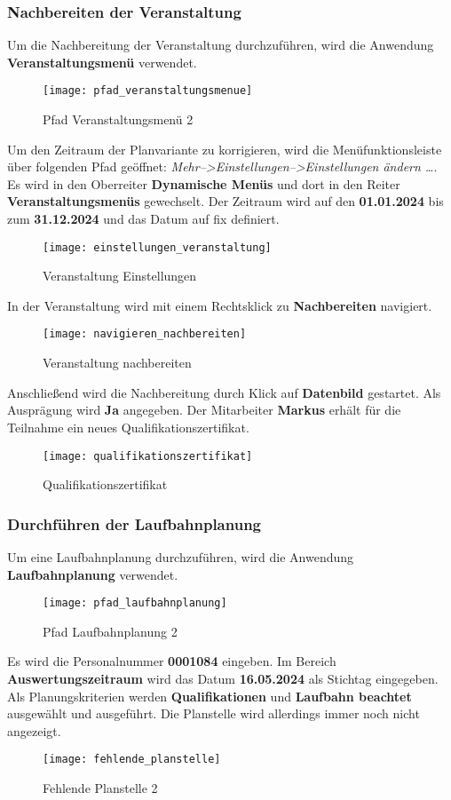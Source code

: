 \subsubsection{Nachbereiten der Veranstaltung}
Um die Nachbereitung der Veranstaltung durchzuführen, wird die Anwendung \textbf{Veranstaltungsmenü} verwendet.
\begin{figure}[H]
	\centering
	\texttt{[image: pfad\_veranstaltungsmenue]}
	\caption{Pfad Veranstaltungsmenü 2}
	\label{fig:pfad_veranstaltungsmenue2}
\end{figure}
Um den Zeitraum der Planvariante zu korrigieren, wird die Menüfunktionsleiste über folgenden Pfad geöffnet: \textit{Mehr-->Einstellungen-->Einstellungen ändern …}. Es wird in den Oberreiter \textbf{Dynamische Menüs} und dort in den Reiter \textbf{Veranstaltungsmenüs} gewechselt. Der Zeitraum wird auf den \textbf{01.01.2024} bis zum \textbf{31.12.2024} und das Datum auf fix definiert.
\begin{figure}[H]
	\centering
	\texttt{[image: einstellungen\_veranstaltung]}
	\caption{Veranstaltung Einstellungen}
	\label{fig:einstellungen_veranstaltung}
\end{figure}
In der Veranstaltung wird mit einem Rechtsklick zu \textbf{Nachbereiten} navigiert.
\begin{figure}[H]
	\centering
	\texttt{[image: navigieren\_nachbereiten]}
	\caption{Veranstaltung nachbereiten}
	\label{fig:navigieren_nachbereiten}
\end{figure}
Anschließend wird die Nachbereitung durch Klick auf \textbf{Datenbild} gestartet. Als Ausprägung wird \textbf{Ja} angegeben. Der Mitarbeiter \textbf{Markus} erhält für die Teilnahme ein neues Qualifikationszertifikat.
\begin{figure}[H]
	\centering
	\texttt{[image: qualifikationszertifikat]}
	\caption{Qualifikationszertifikat}
	\label{fig:qualifikationszertifikat}
\end{figure}

\subsubsection{Durchführen der Laufbahnplanung}
Um eine Laufbahnplanung durchzuführen, wird die Anwendung \textbf{Laufbahnplanung} verwendet.
\begin{figure}[H]
	\centering
	\texttt{[image: pfad\_laufbahnplanung]}
	\caption{Pfad Laufbahnplanung 2}
	\label{fig:pfad_laufbahnplanung2}
\end{figure}
Es wird die Personalnummer \textbf{0001084} eingeben. Im Bereich \textbf{Auswertungszeitraum} wird das Datum \textbf{16.05.2024} als Stichtag eingegeben. Als Planungskriterien werden \textbf{Qualifikationen} und \textbf{Laufbahn beachtet} ausgewählt und ausgeführt. Die Planstelle wird allerdings immer noch nicht angezeigt.
\begin{figure}[H]
	\centering
	\texttt{[image: fehlende\_planstelle]}
	\caption{Fehlende Planstelle 2}
	\label{fig:fehlende_planstelle2}
\end{figure}


